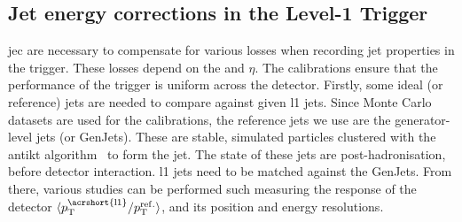 



\subsection{Jet energy corrections in the Level-1 Trigger}
\label{subsubsec:detector_jecs}


\Gls{jec} are necessary to compensate for various losses when recording jet properties in the trigger. These losses depend on the \pt and $\eta$. The calibrations ensure that the performance of the trigger is uniform across the detector. Firstly, some ideal (or reference) jets are needed to compare against given \acrshort{l1} jets. Since Monte Carlo datasets are used for the calibrations, the reference jets we use are the generator-level jets (or GenJets). These are stable, simulated particles clustered with the \gls{antikt} algorithm~\cite{Cacciari:2008gp} to form the jet. The state of these jets are post-hadronisation, before detector interaction. \acrshort{l1} jets need to be matched against the GenJets. From there, various studies can be performed such measuring the response of the detector $\langle \ptsup{{\mathrm{\acrshort{l1}}}} / \ptsup{{\mathrm{ref.}}} \rangle$, and its position and energy resolutions.

